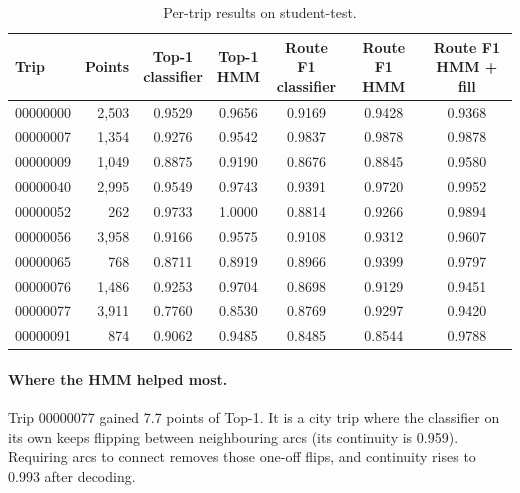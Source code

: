 \documentclass[11pt,a4paper]{article}
\begin{document}
\begin{table}[H]
\centering
\small
\begin{tabular}{@{}lrccccc@{}}
\toprule
\textbf{Trip} & \textbf{Points} & \makecell{\textbf{Top-1}\\\textbf{classifier}} & \makecell{\textbf{Top-1}\\\textbf{HMM}} &
\makecell{\textbf{Route F1}\\\textbf{classifier}} & \makecell{\textbf{Route F1}\\\textbf{HMM}} & \makecell{\textbf{Route F1}\\\textbf{HMM + fill}} \\
\midrule
00000000 & 2,503 & 0.9529 & 0.9656 & 0.9169 & 0.9428 & 0.9368 \\
00000007 & 1,354 & 0.9276 & 0.9542 & 0.9837 & 0.9878 & 0.9878 \\
00000009 & 1,049 & 0.8875 & 0.9190 & 0.8676 & 0.8845 & 0.9580 \\
00000040 & 2,995 & 0.9549 & 0.9743 & 0.9391 & 0.9720 & 0.9952 \\
00000052 & 262 & 0.9733 & 1.0000 & 0.8814 & 0.9266 & 0.9894 \\
00000056 & 3,958 & 0.9166 & 0.9575 & 0.9108 & 0.9312 & 0.9607 \\
00000065 & 768 & 0.8711 & 0.8919 & 0.8966 & 0.9399 & 0.9797 \\
00000076 & 1,486 & 0.9253 & 0.9704 & 0.8698 & 0.9129 & 0.9451 \\
00000077 & 3,911 & 0.7760 & 0.8530 & 0.8769 & 0.9297 & 0.9420 \\
00000091 & 874 & 0.9062 & 0.9485 & 0.8485 & 0.8544 & 0.9788 \\
\bottomrule
\end{tabular}
\caption{Per-trip results on student-test.}
\end{table}

\paragraph{Where the HMM helped most.}
Trip 00000077 gained 7.7 points of Top-1. It is a city trip where the classifier on its own keeps flipping
between neighbouring arcs (its continuity is 0.959). Requiring arcs to connect removes those one-off flips,
and continuity rises to 0.993 after decoding.
\end{document}
